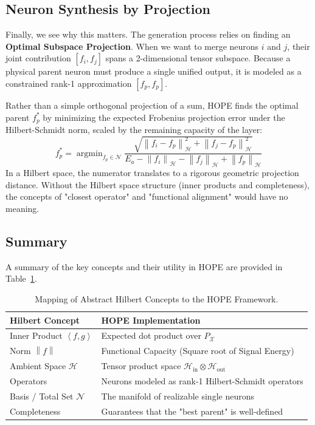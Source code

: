 \documentclass[11pt, a4paper, copyright, gdm]{google}
\newcommand{\norm}[1]{\left\lVert#1\right\rVert}
\newcommand{\inner}[2]{\left\langle#1, #2\right\rangle}
\newcommand{\calH}{\mathcal{H}}
\newcommand{\calN}{\mathcal{N}}
\newcommand{\calX}{\mathcal{X}}
\DeclareMathOperator{\argmin}{argmin}
\theoremstyle{definition}
\begin{document}
\subsection{Neuron Synthesis by Projection}

Finally, we see why this matters. The generation process relies on finding an \textbf{Optimal Subspace Projection}.
When we want to merge neurons $i$ and $j$, their joint contribution $[f_i, f_j]$ spans a 2-dimensional tensor subspace. Because a physical parent neuron must produce a single unified output, it is modeled as a constrained rank-1 approximation $[f_p, f_p]$. 

Rather than a simple orthogonal projection of a sum, HOPE finds the optimal parent $f_p^*$ by minimizing the expected Frobenius projection error under the Hilbert-Schmidt norm, scaled by the remaining capacity of the layer:
\begin{equation}
    f_p^* = \argmin_{f_p \in \calN} \frac{\sqrt{\norm{f_i - f_p}_{\calH}^2 + \norm{f_j - f_p}_{\calH}^2}}{E_a - \norm{f_i}_{\calH} - \norm{f_j}_{\calH} + \norm{f_p}_{\calH}}
\end{equation}
In a Hilbert space, the numerator translates to a rigorous geometric projection distance. Without the Hilbert space structure (inner products and completeness), the concepts of "closest operator" and "functional alignment" would have no meaning.

\subsection{Summary}
A summary of the key concepts and their utility in HOPE are provided in Table~\ref{tab:hilbert_hope}.

\begin{table}[h]
\centering
\begin{tabular}{ll}
\toprule
\textbf{Hilbert Concept} & \textbf{HOPE Implementation} \\
\midrule
Inner Product $\inner{f}{g}$ & Expected dot product over $P_{\calX}$ \\
Norm $\norm{f}$ & Functional Capacity (Square root of Signal Energy) \\
Ambient Space $\calH$ & Tensor product space $\calH_{\text{in}} \otimes \calH_{\text{out}}$ \\
Operators & Neurons modeled as rank-1 Hilbert-Schmidt operators \\
Basis / Total Set $\calN$ & The manifold of realizable single neurons \\
Completeness & Guarantees that the "best parent" is well-defined \\
\bottomrule
\end{tabular}
\caption{Mapping of Abstract Hilbert Concepts to the HOPE Framework.}
\label{tab:hilbert_hope}
\end{table}
\end{document}

